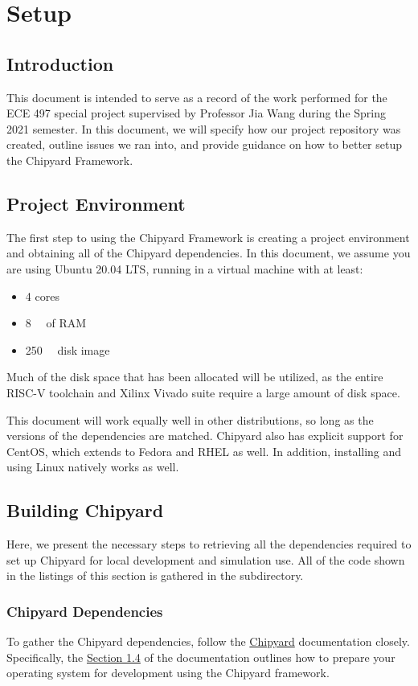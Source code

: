 \chapter{Setup}\label{chap:Setup}
\section{Introduction}\label{sec:Introduction}
This document is intended to serve as a record of the work performed for the ECE 497 special project supervised by Professor Jia Wang during the Spring 2021 semester.
In this document, we will specify how our project repository was created, outline issues we ran into, and provide guidance on how to better setup the Chipyard Framework.

\section{Project Environment}\label{chap:Project_Environment}
The first step to using the Chipyard Framework is creating a project environment and obtaining all of the Chipyard dependencies.
In this document, we assume you are using Ubuntu 20.04 LTS, running in a virtual machine with at least:
\begin{itemize}
\item 4 cores
\item \SI{8}{\giga\byte} of RAM
\item \SI{250}{\giga\byte} disk image
\end{itemize}

Much of the disk space that has been allocated will be utilized, as the entire RISC-V toolchain and Xilinx Vivado suite require a large amount of disk space.

This document will work equally well in other distributions, so long as the versions of the dependencies are matched.
Chipyard also has explicit support for CentOS, which extends to Fedora and RHEL as well.
In addition, installing and using Linux natively works as well.

\section{Building Chipyard}\label{sec:Building_Chipyard}
Here, we present the necessary steps to retrieving all the dependencies required to set up Chipyard for local development and simulation use.
All of the code shown in the listings of this section is gathered in the  subdirectory.

\subsection{Chipyard Dependencies}\label{sec:Chipyard_Dependencies}
To gather the Chipyard dependencies, follow the \href{https://chipyard.readthedocs.io/en/latest/}{Chipyard} documentation closely.
Specifically, the \href{https://chipyard.readthedocs.io/en/latest/Chipyard-Basics/Initial-Repo-Setup.html}{Section 1.4} of the documentation outlines how to prepare your operating system for development using the Chipyard framework.

